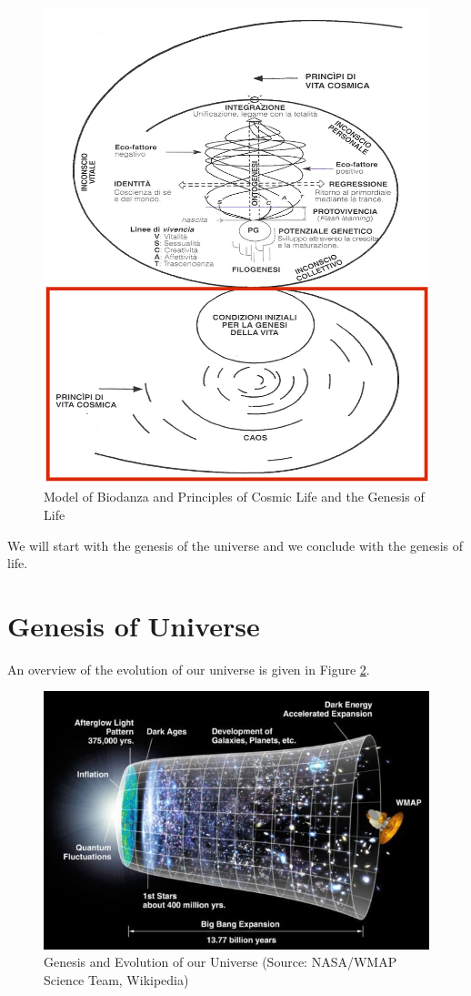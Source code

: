 \documentclass[
  11pt,
]{book}
\begin{document}
\begin{figure}

{\centering \includegraphics[width=0.5\linewidth]{./figs/biologischeAspectenBiodanzaDeelI} 

}

\caption{Model of Biodanza and Principles of Cosmic Life and the Genesis of Life}\label{fig:modelCosmic}
\end{figure}

We will start with the genesis of the universe and we conclude with the genesis of life.

\hypertarget{genesis-of-universe}{%
\section{Genesis of Universe}\label{genesis-of-universe}}

An overview of the evolution of our universe is given in Figure \ref{fig:evolutionUniverse}.

\begin{figure}

{\centering \includegraphics[width=1\linewidth]{./figs/originKosmos} 

}

\caption{Genesis and Evolution of our Universe (Source: NASA/WMAP Science Team, Wikipedia)}\label{fig:evolutionUniverse}
\end{figure}
\end{document}
